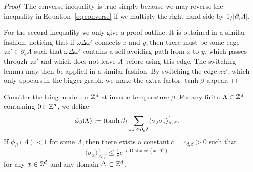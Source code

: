 \begin{proof}
    The converse inequality is true simply because we may reverse the inequality in
    Equation~\eqref{eq:converse} if we multiply the right hand side by $1/|\partial_\circ\Lambda|$.

    For the second inequality we only give a proof outline.
    It is obtained in a similar fashion,
    noticing that if $\omega\Delta\omega'$ connects
    $x$ and $y$,
    then there must be some edge $zz'\in\partial_e\Lambda$
    such that $\omega\Delta\omega'$ contains a self-avoiding path
    from $x$ to $y$, which passes through $zz'$ 
    and which does not leave $\Lambda$ before using this edge.
    The switching lemma may then be applied in a similar fashion.
    By switching the edge $zz'$, which only appears in the bigger
    graph,
    we make the extra factor $\tanh\beta$ appear.
\end{proof}

\begin{corollary}
    Consider the Ising model on $\mathbb Z^d$ at inverse temperature $\beta$.
    For any finite $\Lambda\subset\mathbb Z^d$ containing $0\in\mathbb Z^d$,
    we define
    \[
        \phi_\beta(\Lambda):=
        (\tanh\beta)
        \sum_{zz'\in\partial_e\Lambda}
            \langle\sigma_0\sigma_z\rangle_{\Lambda,\beta}^{\operatorname{f}}.
    \]
    If $\phi_\beta(\Lambda)<1$ for some $\Lambda$, then
    there exists a constant $c=c_{d,\beta}>0$
    such that
    \[
        \langle\sigma_x\rangle_{\Delta,\beta}^+
        \leq \tfrac1ce^{-c \operatorname{Distance}(x,\Delta^c)}
    \]
    for any $x\in\mathbb Z^d$ and any domain $\Delta\subset\mathbb Z^d$.
\end{corollary}

